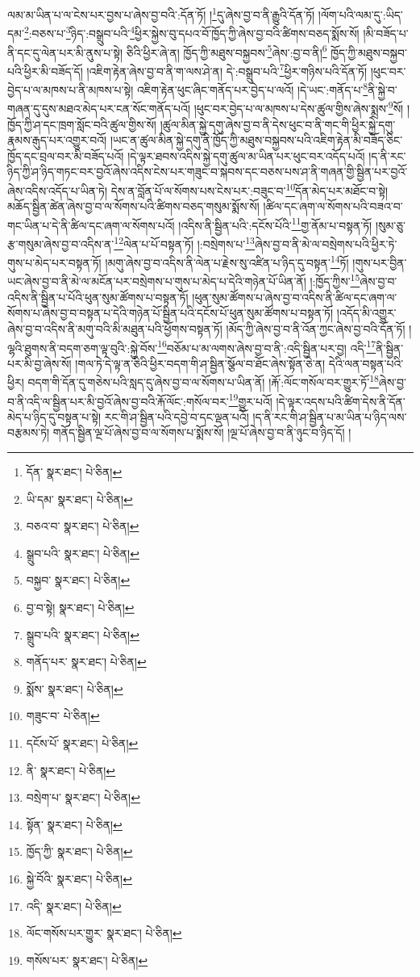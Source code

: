 ལམ་མ་ཡིན་པ་ལ་ངེས་པར་བྱས་པ་ཞེས་བྱ་བའི་:དོན་ཏོ། །\footnote{དོན་  སྣར་ཐང་།  པེ་ཅིན། }དུ་ཞེས་བྱ་བ་ནི་རྒྱུའི་དོན་ཏོ། །ལོག་པའི་ལམ་དུ་:ཡིད་དམ་\footnote{ཡི་དམ་  སྣར་ཐང་།  པེ་ཅིན། }:བཅས་པ་\footnote{བཅའ་བ་  སྣར་ཐང་།  པེ་ཅིན། }ཉིད་:བསྒྲུབ་པའི་\footnote{སྒྲུབ་པའི་  སྣར་ཐང་།  པེ་ཅིན། }ཕྱིར་སྐྱེས་བུ་དཔའ་བོ་ཁྱོད་ཀྱི་ཞེས་བྱ་བའི་ཚིགས་བཅད་སྨོས་སོ། །མི་བཟོད་པ་ནི་དང་དུ་ལེན་པར་མི་ནུས་པ་སྟེ། ཅིའི་ཕྱིར་ཞེ་ན། ཁྱོད་ཀྱི་མཐུས་བསྐྱབས་\footnote{བསྐྱབ་  སྣར་ཐང་།  པེ་ཅིན། }ཞེས་:བྱ་བ་ནི།\footnote{བྱ་བ་སྟེ།  སྣར་ཐང་།  པེ་ཅིན། } ཁྱོད་ཀྱི་མཐུས་བསྐྱབ་པའི་ཕྱིར་མི་བཟོད་དོ། །འཇིག་རྟེན་ཞེས་བྱ་བ་ནི་ག་ལས་ཤེ་ན། དེ་:བསྒྲུབ་པའི་\footnote{སྒྲུབ་པའི་  སྣར་ཐང་།  པེ་ཅིན། }ཕྱིར་གཉིས་པའི་དོན་ཏོ། །ཕུང་བར་བྱེད་པ་ལ་མཁས་པ་ནི་མཁས་པ་སྟེ། འཇིག་རྟེན་ཕུང་ཞིང་གནོད་པར་བྱེད་པ་ལའོ། །དེ་ཡང་:གནོད་པ་\footnote{གནོད་པར་  སྣར་ཐང་།  པེ་ཅིན། }ནི་སྐྱེ་བ་གཞན་དུ་དུས་མཐའ་མེད་པར་ངན་སོང་གནོད་པའོ། །ཕུང་བར་བྱེད་པ་ལ་མཁས་པ་དེས་ཚུལ་གྱིས་ཞེས་སྨྲས་\footnote{སྨོས་  སྣར་ཐང་།  པེ་ཅིན། }སོ། །ཁྱོད་ཀྱི་ཤ་དང་ཁྲག་སློང་བའི་ཚུལ་གྱིས་སོ། །ཚུལ་མིན་སྐྱེ་དགུ་ཞེས་བྱ་བ་ནི་དེས་ཕུང་བ་ནི་གང་གི་ཕྱིར་སྐྱེ་དགུ་རྣམས་རྒུད་པར་འགྱུར་བའོ། །ཡང་ན་ཚུལ་མིན་སྐྱེ་དགུ་ནི་ཁྱོད་ཀྱི་མཐུས་བསྐྱབས་པའི་འཇིག་རྟེན་མི་བཟོད་ཅིང་ཁྱོད་དང་བྲལ་བར་མི་བཟོད་པའོ། །དེ་ལྟར་ཐབས་འདིས་སྐྱེ་དགུ་ཚུལ་མ་ཡིན་པར་ཕུང་བར་འདོད་པའོ། །ད་ནི་རང་ཉིད་ཀྱི་ཤ་ཉིད་གཏང་བར་བྱའོ་ཞེས་འདིས་ངེས་པར་གཟུང་བ་སྐབས་དང་བཅས་པས་ཤ་ནི་གཞན་གྱི་སྦྱིན་པར་བྱའོ་ཞེས་འདིས་འདོད་པ་ཡིན་ཏེ། དེས་ན་བློན་པོ་ལ་སོགས་པས་ངེས་པར་:བཟུང་བ་\footnote{གཟུང་བ་  པེ་ཅིན། }དོན་མེད་པར་མཐོང་བ་སྟེ། མཆོད་སྦྱིན་ཚེན་ཞེས་བྱ་བ་ལ་སོགས་པའི་ཚིགས་བཅད་གསུམ་སྨོས་སོ། །ཚིལ་དང་ཞག་ལ་སོགས་པའི་བཟའ་བ་གང་ཡིན་པ་དེ་ནི་ཚིལ་དང་ཞག་ལ་སོགས་པའོ། །འདིས་ནི་སྦྱིན་པའི་:དངོས་པོའི་\footnote{དངོས་པོ་  སྣར་ཐང་།  པེ་ཅིན། }གྱ་ནོམ་པ་བསྟན་ཏོ། །སུམ་ཅུ་རྩ་གསུམ་ཞེས་བྱ་བ་འདིས་ན་\footnote{ནི་  སྣར་ཐང་།  པེ་ཅིན། }ལེན་པ་པོ་བསྟན་ཏོ། །:བསྲེགས་པ་\footnote{བསྲེག་པ་  སྣར་ཐང་།  པེ་ཅིན། }ཞེས་བྱ་བ་ནི་མེ་ལ་བསྲེགས་པའི་ཕྱིར་ཏེ་གུས་པ་མེད་པར་བསྟན་ཏོ། །མགུ་ཞེས་བྱ་བ་འདིས་ནི་ལེན་པ་རྗེས་སུ་འཛིན་པ་ཉིད་དུ་བསྟན་\footnote{སྟོན་  སྣར་ཐང་།  པེ་ཅིན། }ཏོ། །གུས་པར་བྱིན་ཡང་ཞེས་བྱ་བ་ནི་མེ་ལ་མངོན་པར་བསྲེགས་པ་གུས་པ་མེད་པ་དེའི་གཉེན་པོ་ཡིན་ནོ། །:ཁྱོད་ཀྱིས་\footnote{ཁྱོད་ཀྱི་  སྣར་ཐང་།  པེ་ཅིན། }ཞེས་བྱ་བ་འདིས་ནི་སྦྱིན་པ་པོའི་ཕུན་སུམ་ཚོགས་པ་བསྟན་ཏོ། །ཕུན་སུམ་ཚོགས་པ་ཞེས་བྱ་བ་འདིས་ནི་ཚིལ་དང་ཞག་ལ་སོགས་པ་ཞེས་བྱ་བ་བསྟན་པ་དེའི་གཉེན་པོ་སྦྱིན་པའི་དངོས་པོ་ཕུན་སུམ་ཚོགས་པ་བསྟན་ཏོ། །འདོད་མི་འགྱུར་ཞེས་བྱ་བ་འདིས་ནི་མགུ་བའི་མི་མཐུན་པའི་ཕྱོགས་བསྟན་ཏོ། །མོད་ཀྱི་ཞེས་བྱ་བ་ནི་འོན་ཀྱང་ཞེས་བྱ་བའི་དོན་ཏོ། །ལྷའི་ཐུགས་ནི་བདག་ཅག་ལྟ་བུའི་:སྐྱེ་བོས་\footnote{སྐྱེ་བོའི་  སྣར་ཐང་།  པེ་ཅིན། }བཅོམ་པ་མ་ལགས་ཞེས་བྱ་བ་ནི་:འདི་སྦྱིན་པར་བྱ། འདི་\footnote{འདི་  སྣར་ཐང་།  པེ་ཅིན། }ནི་སྦྱིན་པར་མི་བྱ་ཞེས་སོ། །གལ་ཏེ་དེ་ལྟ་ན་ཅིའི་ཕྱིར་བདག་གི་ཤ་སྦྱིན་སྩོལ་བ་ཐོང་ཞེས་སྟོན་ཅེ་ན། དེའི་ལན་བསྟན་པའི་ཕྱིར། བདག་གི་དོན་དུ་གཅེས་པའི་སླད་དུ་ཞེས་བྱ་བ་ལ་སོགས་པ་ཡིན་ནོ། །རྐོ་:ལོང་གསོལ་བར་གྱུར་ཏོ་\footnote{ལོང་གསོས་པར་གྱུར་  སྣར་ཐང་།  པེ་ཅིན། }ཞེས་བྱ་བ་ནི་འདི་ལ་སྦྱིན་པར་མི་བྱའོ་ཞེས་བྱ་བའི་རྐོ་ལོང་:གསོལ་བར་\footnote{གསོས་པར་  སྣར་ཐང་།  པེ་ཅིན། }གྱུར་པའོ། །དེ་ལྟར་འདས་པའི་ཚིག་དེས་ནི་དོན་མེད་པ་ཉིད་དུ་བསྟན་པ་སྟེ། རང་གི་ཤ་སྦྱིན་པའི་དབྱེ་བ་དང་ལྡན་པའོ། །ད་ནི་རང་གི་ཤ་སྦྱིན་པ་མ་ཡིན་པ་ཉིད་ལས་བརྩམས་ཏེ། གནོད་སྦྱིན་ལྔ་པོ་ཞེས་བྱ་བ་ལ་སོགས་པ་སྨོས་སོ། །ལྔ་པོ་ཞེས་བྱ་བ་ནི་ཉུང་བ་ཉིད་དོ། །
